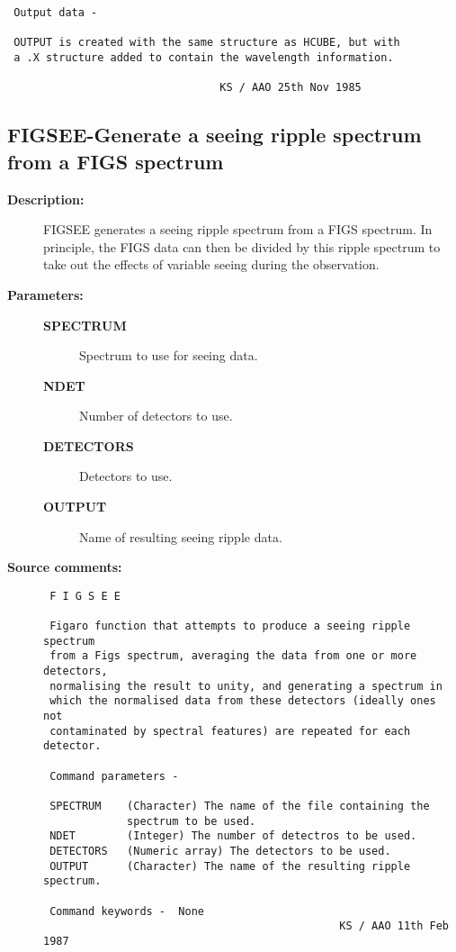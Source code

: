 \begin{description}
\begin{verbatim}
 Output data -

 OUTPUT is created with the same structure as HCUBE, but with
 a .X structure added to contain the wavelength information.

                                 KS / AAO 25th Nov 1985
\end{verbatim}
\end{description}
\subsection{FIGSEE-\label{FIGSEE}Generate a seeing ripple spectrum from a FIGS spectrum}
\begin{description}

\item [{\bf Description:}]
 FIGSEE generates a seeing ripple spectrum from a FIGS spectrum.
 In principle, the FIGS data can then be divided by this ripple
 spectrum to take out the effects of variable seeing during the
 observation.

\item [{\bf Parameters:}]
\begin{description}
\item [{\bf SPECTRUM}]
 Spectrum to use for seeing data.
\item [{\bf NDET}]
 Number of detectors to use.
\item [{\bf DETECTORS}]
 Detectors to use.
\item [{\bf OUTPUT}]
 Name of resulting seeing ripple data.
\end{description}

\item [{\bf Source comments:}]
\begin{verbatim}
 F I G S E E

 Figaro function that attempts to produce a seeing ripple spectrum
 from a Figs spectrum, averaging the data from one or more detectors,
 normalising the result to unity, and generating a spectrum in
 which the normalised data from these detectors (ideally ones not
 contaminated by spectral features) are repeated for each detector.

 Command parameters -

 SPECTRUM    (Character) The name of the file containing the
             spectrum to be used.
 NDET        (Integer) The number of detectros to be used.
 DETECTORS   (Numeric array) The detectors to be used.
 OUTPUT      (Character) The name of the resulting ripple spectrum.

 Command keywords -  None
                                              KS / AAO 11th Feb 1987
\end{verbatim}
\end{description}
